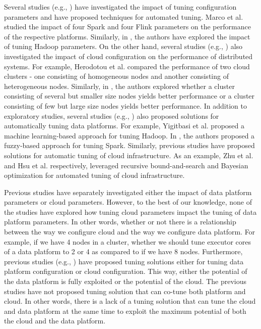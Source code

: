 \documentclass[3p]{elsarticle}
\begin{document}
Several studies (e.g., \cite{marcu2016spark, zhu2017bestconfig, yigitbasi2013towards, wu2013self, wang2012predator, ullah2022scalability}) have investigated the impact of tuning configuration parameters and have proposed techniques for automated tuning. Marco et al. \cite{marcu2016spark} studied the impact of four Spark and four Flink parameters on the performance of the respective platforms. Similarly, in \cite{yigitbasi2013towards, wu2013self,wang2012predator}, the authors have explored the impact of tuning Hadoop parameters. On the other hand, several studies (e.g., \cite{herodotou2011no, lama2012aroma}) also investigated the impact of cloud configuration on the performance of distributed systems. For example, Herodotou et al. \cite{herodotou2011no} compared the performance of two cloud clusters - one consisting of homogeneous nodes and another consisting of heterogeneous nodes. Similarly, in \cite{lama2012aroma}, the authors explored whether a cluster consisting of several but smaller size nodes yields better performance or a cluster consisting of few but large size nodes yields better performance. In addition to exploratory studies, several studies (e.g., \cite{yigitbasi2013towards, perez2018pets}) also proposed solutions for automatically tuning data platforms. For example, Yigitbasi et al. \cite{yigitbasi2013towards} proposed a machine learning-based approach for tuning Hadoop. In \cite{perez2018pets}, the authors proposed a fuzzy-based approach for tuning Spark. Similarly, previous studies have proposed solutions for automatic tuning of cloud infrastructure. As an example, Zhu et al. \cite{zhu2017bestconfig} and Hsu et al. \cite{hsu2018scout} respectively, leveraged recursive bound-and-search and Bayesian optimization for automated tuning of cloud infrastructure.   

Previous studies have separately investigated either the impact of data platform parameters or cloud parameters. However, to the best of our knowledge, none of the studies have explored how tuning cloud parameters impact the tuning of data platform parameters. In other words, whether or not there is a relationship between the way we configure cloud and the way we configure data platform. For example, if we have 4 nodes in a cluster, whether we should tune executor cores of a data platform to 2 or 4 as compared to if we have 8 nodes. Furthermore, previous studies (e.g., \cite{zhu2017bestconfig, yigitbasi2013towards, wu2013self, wang2012predator, ullah2022adaptive}) have proposed tuning solutions either for tuning data platform configuration or cloud configuration. This way, either the potential of the data platform is fully exploited or the potential of the cloud. The previous studies have not proposed tuning solution that can co-tune both platform and cloud. In other words, there is a lack of a tuning solution that can tune the cloud and data platform at the same time to exploit the maximum potential of both the cloud and the data platform.
\end{document}
